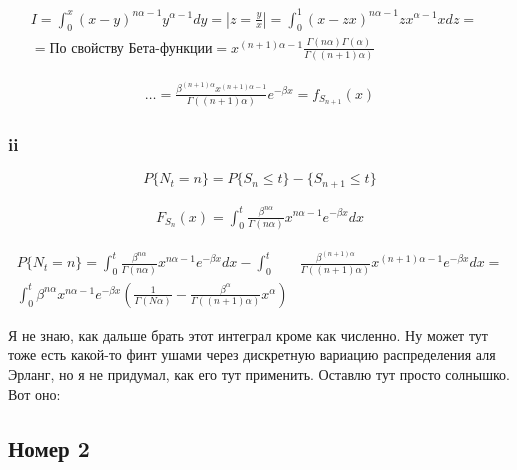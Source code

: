 \documentclass[a4paper,12pt]{article}
\begin{document}
\begin{equation}
\begin{aligned}
I = \int_{0}^{x} (x-y)^{n\alpha - 1} y^{\alpha-1} dy = |z = \frac{y}{x}| = \int_{0}^{1} (x - zx)^{n\alpha - 1}zx^{\alpha-1} x dz =&\\ = \text{По свойству Бета-функции} = x^{(n+1)\alpha - 1} \frac{\Gamma(n\alpha) \Gamma(\alpha)}{\Gamma((n+1)\alpha)}
\end{aligned}
\end{equation}


\begin{equation}
\begin{aligned}
\dots = \frac{\beta^{(n+1)\alpha} x^{(n+1) \alpha - 1}}{\Gamma((n+1)\alpha)} e^{-\beta x} = f_{S_{n+1}}(x)
\end{aligned}
\end{equation}

\subsubsection{ii}

\[ P\{N_t = n\} = P\{S_n \le t\} - {\{ S_{n+1} \le t \}} \]


\begin{equation}
\begin{aligned}
F_{S_n}(x) = \int_{0}^{t} \frac{\beta^{n\alpha}}{\Gamma(n\alpha)} x^{n\alpha-1} e^{-\beta x} dx
\end{aligned}
\end{equation}

\begin{equation}
\begin{aligned}
P\{N_t = n\} = \int_{0}^{t} \frac{\beta^{n\alpha}}{\Gamma(n\alpha)} x^{n\alpha-1} e^{-\beta x} dx - \int_{0}^{t} & \frac{\beta^{(n+1)\alpha}}{\Gamma((n+1)\alpha)} x^{(n+1)\alpha-1} e^{-\beta x} dx = \\
\int_{0}^{t} \beta^{n\alpha} x^{n\alpha-1} e^{-\beta x} (\frac{1}{\Gamma(N\alpha)} - \frac{\beta^\alpha}{\Gamma((n+1)\alpha)}x^\alpha) 
\end{aligned}
\end{equation}

Я не знаю, как дальше брать этот интеграл кроме как численно. Ну может тут тоже есть какой-то финт ушами через дискретную вариацию распределения аля Эрланг, но я не придумал, как его тут применить. Оставлю тут просто солнышко. Вот оно: \Sun


\subsection{Номер 2}
\end{document}
